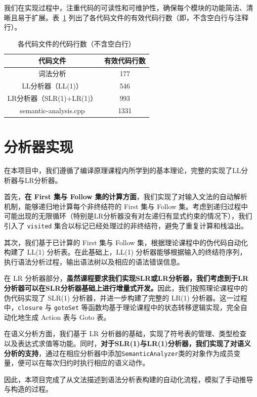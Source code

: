 \documentclass[UTF8,openany]{ctexbook}
\begin{document}
我们在实现过程中，注重代码的可读性和可维护性，确保每个模块的功能简洁、清晰且易于扩展。表~\ref{tab:code_lines} 列出了各代码文件的有效代码行数（即，不含空白行与注释行）。

\begin{table}[htbp]
\centering
\caption{各代码文件的代码行数（不含空白行）}
\label{tab:code_lines}
\begin{tabular*}{0.7\textwidth}{@{\extracolsep{\fill}}cc}
\toprule
代码文件 & 有效代码行数 \\
\midrule
词法分析 & 177 \\
LL分析器（LL(1)） & 546 \\
LR分析器（SLR(1)+LR(1)） & 993 \\
semantic-analysis.cpp & 1331 \\
\bottomrule
\end{tabular*}
\end{table}


\section{分析器实现}

在本项目中，我们遵循了编译原理课程内所学到的基本理论，完整的实现了LL分析器与LR分析器。

首先，\textbf{在 First 集与 Follow 集的计算方面}，我们实现了对输入文法的自动解析机制，能够递归地计算每个非终结符的 First 集与 Follow 集。考虑到递归过程中可能出现的无限循环（特别是LR分析器没有对左递归有显式约束的情况下），我们引入了 \texttt{visited} 集合以标记已经处理过的非终结符，避免了重复计算和栈溢出。

其次，我们基于已计算的 First 集与 Follow 集，根据理论课程中的伪代码自动化构建了 LL(1) 分析表。在此基础上，LL(1) 分析器能够根据输入的终结符序列，执行语法分析过程，输出语法树以及相应的语法错误信息。

在 LR 分析器部分，\textbf{虽然课程要求我们实现SLR或LR分析器，我们考虑到于LR分析器可以在SLR分析器基础上进行增量式开发。}因此，我们按照理论课程中的伪代码实现了 SLR(1) 分析器，并进一步构建了完整的 LR(1) 分析器。这一过程中，\texttt{closure} 与 \texttt{gotoSet} 等函数均基于理论课程中的状态转移逻辑实现，完全自动化地生成 Action 表与 Goto 表。

在语义分析方面，我们基于 LR 分析器的基础，实现了符号表的管理、类型检查以及表达式求值等功能。同时，\textbf{对于SLR(1)与LR(1)分析器，我们实现了对语义分析的支持}，通过在相应分析器中添加\texttt{SemanticAnalyzer}类的对象作为成员变量，便可以在每次归约时执行相应的语义动作。

因此，本项目完成了从文法描述到语法分析表构建的自动化流程，模拟了手动推导与构造的过程。
\end{document}
